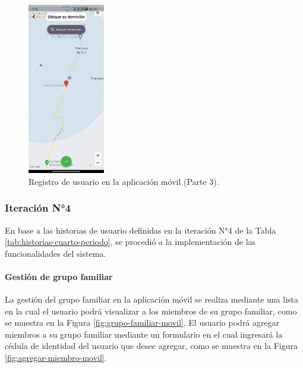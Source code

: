 \begin{figure}[H]
    \centering
    \includegraphics[width=0.3\textwidth]{chapters/III-resultados-y-discusion/resources/images/registro-usuario-movil-3.png}
    \caption{Registro de usuario en la aplicación móvil (Parte 3).}
    \label{fig:registro-usuario-movil-3}
\end{figure}

\subsubsection{Iteración N°4}

En base a las historias de usuario definidas en la iteración N°4 de la Tabla \ref{tab:historias-cuarto-periodo}, se procedió a la implementación
de las funcionalidades del sistema.

\paragraph{Gestión de grupo familiar}
La gestión del grupo familiar en la aplicación móvil se realiza mediante una lista en la cual el usuario podrá visualizar a
los miembros de su grupo familiar, como se muestra en la Figura \ref{fig:grupo-familiar-movil}. El usuario podrá agregar
miembros a su grupo familiar mediante un formulario en el cual ingresará la cédula de identidad del usuario que desee
agregar, como se muestra en la Figura \ref{fig:agregar-miembro-movil}.

